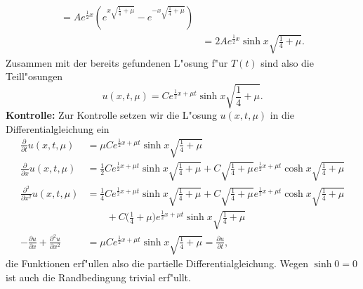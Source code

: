 \begin{loesung}
\begin{teilaufgaben}
\begin{align*}
=Ae^{\frac12x}\left(
e^{x\sqrt{\frac14+\mu}}
-
e^{-x\sqrt{\frac14+\mu}}
\right)
\\
&=2Ae^{\frac12x}\sinh x\sqrt{\frac14+\mu}.
\end{align*}
Zusammen mit der bereits gefundenen L"osung f"ur $T(t)$ sind also
die Teill"osungen
\[
u(x,t,\mu)=
Ce^{\frac12x+\mu t}\sinh x\sqrt{\frac14+\mu}.
\]
{\bf Kontrolle:} Zur Kontrolle setzen wir die L"osung $u(x,t,\mu)$
in die Differentialgleichung ein
\begin{align*}
\frac{\partial}{\partial t}u(x,t,\mu)&=
\mu Ce^{\frac12x+\mu t}\sinh x\sqrt{\frac14+\mu}
\\
\frac{\partial}{\partial x}u(x,t,\mu)&=
\frac12
Ce^{\frac12x+\mu t}\sinh x\sqrt{\frac14+\mu}
+
C\sqrt{\frac14+\mu}e^{\frac12x+\mu t}\cosh x\sqrt{\frac14+\mu}
\\
\frac{\partial^2}{\partial x^2}u(x,t,\mu)&=
\frac14
Ce^{\frac12x+\mu t}\sinh x\sqrt{\frac14+\mu}
+
C\sqrt{\frac14+\mu}e^{\frac12x+\mu t}\cosh x\sqrt{\frac14+\mu}
\\
&\qquad +
C\biggl(\frac14+\mu\biggr)e^{\frac12x+\mu t}\sinh x\sqrt{\frac14+\mu}
\\
-\frac{\partial u}{\partial x}
+
\frac{\partial^2 u}{\partial x^2}
&=
\mu Ce^{\frac12x+\mu t}\sinh x\sqrt{\frac14+\mu}
=
\frac{\partial u}{\partial t},
\end{align*}
die Funktionen erf"ullen also die partielle Differentialgleichung.
Wegen $\sinh 0=0$ ist auch die Randbedingung trivial erf"ullt.
\qedhere
\end{teilaufgaben}
\end{loesung}
